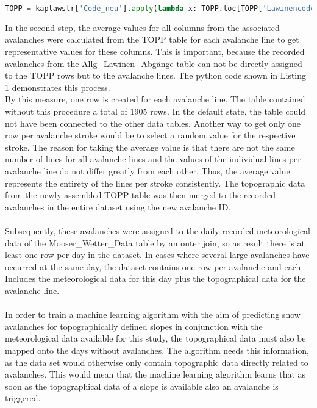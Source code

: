 \documentclass[../masterarbeit.tex]{subfiles}
\begin{document}
\begin{lstlisting}[language=Python, caption=calculation of TOPP data for every avalanche line]
TOPP = kaplawstr['Code_neu'].apply(lambda x: TOPP.loc[TOPP['Lawinencode'] == x].mean())
\end{lstlisting} 
In the second step, the average values for all columns from the associated avalanches were calculated from the TOPP table for each avalanche line to get representative values for these columns. This is important, because the recorded avalanches from the Allg\_Lawinen\_Abgänge table can not be directly assigned to the TOPP rows but to the avalanche lines. The python code shown in Listing 1 demonstrates this process. \\
By this measure, one row is created for each avalanche line. The table contained without this procedure a total of 1905 rows. In the default state, the table could not have been connected to the other data tables. Another way to get only one row per avalanche stroke would be to select a random value for the respective stroke. The reason for taking the average value is that there are not the same number of lines for all avalanche lines and the values of the individual lines per avalanche line do not differ greatly from each other. Thus, the average value represents the entirety of the lines per stroke consistently. The topographic data from the newly assembled TOPP table was then merged to the recorded avalanches in the entire dataset using the new avalanche ID. \\~\\
Subsequently, these avalanches were assigned to the daily recorded meteorological data of the Mooser\_Wetter\_Data table by an outer join, so as result there is at least one row per day in the dataset. In cases where several large avalanches have occurred at the same day, the dataset contains one row per avalanche and each Includes the meteorological data for this day plus the topographical data for the avalanche line. \\~\\
In order to train a machine learning algorithm with the aim of predicting snow avalanches for topographically defined slopes in conjunction with the meteorological data available for this study, the topographical data must also be mapped onto the days without avalanches. The algorithm needs this information, as the data set would otherwise only contain topographic data directly related to avalanches. This would mean that the machine learning algorithm learns that as soon as the topographical data of a slope is available also an avalanche is triggered.
\end{document}
